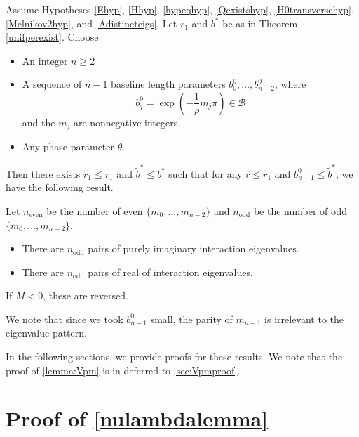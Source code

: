 \documentclass[thesis.tex]{subfiles}
\begin{document}
\begin{theorem}\label{inteigsparity}
Assume Hypotheses \ref{Ehyp}, \ref{Hhyp}, \ref{hypeqhyp}, \ref{Qexistshyp}, \ref{H0transversehyp}, \ref{Melnikov2hyp}, and \ref{Adistincteigs}. Let $r_1$ and $b^*$ be as in Theorem \ref{unifperexist}. Choose
\begin{itemize}
\item An integer $n \geq 2$ 
\item A sequence of $n-1$ baseline length parameters $b_0^0, \dots, b_{n-2}^0$, where 
\[
b_j^0 = \exp\left(-\frac{1}{\rho}m_j \pi\right) \in \mathcal{B}
\]
and the $m_j$ are nonnegative integers.
\item Any phase parameter $\theta$.
\end{itemize}

Then there exists $\tilde{r_1} \leq r_1$ and $\tilde{b}^* \leq b^*$ such that for any $r \leq \tilde{r}_1$ and $b_{n-1}^0 \leq \tilde{b}^*$, we have the following result. 

Let $n_{\text{even}}$ be the number of even $\{m_0, \dots, m_{n-2}\}$ and $n_{\text{odd}}$ be the number of odd $\{m_0, \dots, m_{n-2}\}$. 

\begin{itemize}
\item There are $n_{\text{odd}}$ pairs of purely imaginary interaction eigenvalues.
\item There are $n_{\text{odd}}$ pairs of real of interaction eigenvalues.
\end{itemize}
If $M < 0$, these are reversed.
\end{theorem} 

We note that since we took $b_{n-1}^0$ small, the parity of $m_{n-1}$ is irrelevant to the eigenvalue pattern.

In the following sections, we provide proofs for these results. We note that the proof of \cref{lemma:Vpm} is in deferred to \cref{sec:Vpmproof}.

\section{Proof of \cref{nulambdalemma} }
\end{document}
